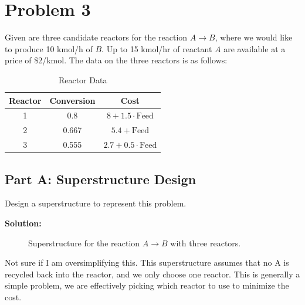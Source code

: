 \documentclass[11pt]{article}
\begin{document}
\clearpage
\section{Problem 3}
\label{prob3}

Given are three candidate reactors for the reaction \( A \rightarrow B \), where we would like to produce 10 kmol/h of \( B \). Up to 15 kmol/hr of reactant \( A \) are available at a price of \$2/kmol. The data on the three reactors is as follows:

\begin{table}[htbp]
\centering
\begin{tabular}{|c|c|c|}
\hline
\textbf{Reactor} & \textbf{Conversion} & \textbf{Cost} \\ \hline
1 & 0.8 & \( 8 + 1.5 \cdot \text{Feed} \) \\ \hline
2 & 0.667 & \( 5.4 + \text{Feed} \) \\ \hline
3 & 0.555 & \( 2.7 + 0.5 \cdot \text{Feed} \) \\ \hline
\end{tabular}
\caption{Reactor Data}
\label{tab:reactor_data}
\end{table}

\subsection{Part A: Superstructure Design}
Design a superstructure to represent this problem.

\textbf{Solution:}
\begin{figure}[htbp]
\centering
{}
\caption{Superstructure for the reaction \( A \rightarrow B \) with three reactors.}
\label{fig:superstructure_reactors}
\end{figure}
Not sure if I am oversimplifying this.
This superstructure assumes that no A is recycled back into the reactor, and we only choose one reactor.
This is generally a simple problem, we are effectively picking which reactor to use to minimize the cost.
\end{document}

